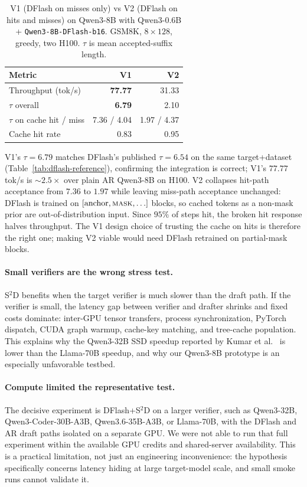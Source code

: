 \begin{table}[t]
  \caption{V1 (DFlash on misses only) vs V2 (DFlash on hits and misses) on
  Qwen3-8B with Qwen3-0.6B + \texttt{Qwen3-8B-DFlash-b16}. GSM8K,
  $8{\times}128$, greedy, two H100. $\tau$ is mean accepted-suffix length.}
  \label{tab:v1-v2}
  \centering
  \scriptsize
  \setlength{\tabcolsep}{3pt}
  \begin{tabular}{@{}lrr@{}}
    \toprule
    Metric & V1 & V2 \\
    \midrule
    Throughput (tok/s)        & \textbf{77.77} & 31.33 \\
    $\tau$ overall            & \textbf{6.79}  & 2.10 \\
    $\tau$ on cache hit / miss & 7.36 / 4.04   & 1.97 / 4.37 \\
    Cache hit rate            & 0.83           & 0.95 \\
    \bottomrule
  \end{tabular}
\end{table}

V1's $\tau{=}6.79$ matches DFlash's published $\tau{=}6.54$ on the same
target+dataset (Table~\ref{tab:dflash-reference}), confirming the
integration is correct; V1's $77.77$ tok/s is $\sim 2.5\times$ over plain
AR Qwen3-8B on H100. V2 collapses hit-path acceptance from $7.36$ to $1.97$
while leaving miss-path acceptance unchanged: DFlash is trained on
$[\text{anchor}, \textsc{mask}, \ldots]$ blocks, so cached tokens as a
non-mask prior are out-of-distribution input. Since $95\%$ of steps hit,
the broken hit response halves throughput. The V1 design choice of
trusting the cache on hits is therefore the right one; making V2 viable
would need DFlash retrained on partial-mask blocks.

\paragraph{Small verifiers are the wrong stress test.}
S$^2$D benefits when the target verifier is much slower than the draft path.
If the verifier is small, the latency gap between verifier and drafter shrinks
and fixed costs dominate: inter-GPU tensor transfers, process synchronization,
PyTorch dispatch, CUDA graph warmup, cache-key matching, and tree-cache
population. This explains why the Qwen3-32B SSD speedup reported by
Kumar et al.~\cite{saguaro2024} is lower than the Llama-70B speedup, and why
our Qwen3-8B prototype is an especially unfavorable testbed.

\paragraph{Compute limited the representative test.}
The decisive experiment is DFlash+S$^2$D on a larger verifier, such as
Qwen3-32B, Qwen3-Coder-30B-A3B, Qwen3.6-35B-A3B, or Llama-70B, with the
DFlash and AR draft paths isolated on a separate GPU. We were not able to run
that full experiment within the available GPU credits and shared-server
availability. This is a practical limitation, not just an engineering
inconvenience: the hypothesis specifically concerns latency hiding at large
target-model scale, and small smoke runs cannot validate it.

